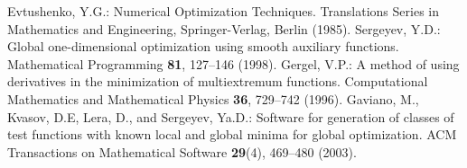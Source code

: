 \documentclass{svproc}
\begin{document}
\begin{thebibliography}{6}
Evtushenko, Y.G.: Numerical Optimization Techniques. Translations Series in Mathematics and Engineering, Springer-Verlag, Berlin (1985).
Sergeyev, Y.D.: Global one-dimensional optimization using smooth auxiliary functions. Mathematical Programming \textbf{81}, 127--146 (1998).
Gergel, V.P.: A method of using derivatives in the minimization of multiextremum functions. Computational Mathematics and Mathematical Physics \textbf{36}, 729--742 (1996). 
Gaviano, M., Kvasov, D.E, Lera, D., and Sergeyev, Ya.D.: Software for generation of classes of test functions with known local and global minima for global optimization. ACM Transactions on Mathematical Software \textbf{29}(4), 469--480 (2003).


\end{thebibliography}
\end{document}
